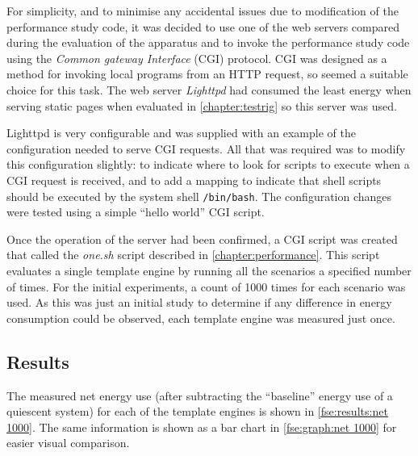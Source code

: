 For simplicity, and to minimise any accidental issues due to modification of the performance study code, it was decided to use one of the web servers compared during the evaluation of the apparatus and to invoke the performance study code using the \emph{Common gateway Interface} (CGI) protocol. CGI was designed as a method for invoking local programs from an HTTP request, so seemed a suitable choice for this task. The web server \emph{Lighttpd} had consumed the least energy when serving static pages when evaluated in \autoref{chapter:testrig} so this server was used.

Lighttpd is very configurable and was supplied with an example of the configuration needed to serve CGI requests. All that was required was to modify this configuration slightly: to indicate where to look for scripts to execute when a CGI request is received, and to add a mapping to indicate that shell scripts should be executed by the system shell \verb!/bin/bash!. The configuration changes were tested using a simple \enquote{hello world} CGI script.

Once the operation of the server had been confirmed, a CGI script was created that called the \emph{one.sh} script described in \autoref{chapter:performance}. This script evaluates a single \gls{template engine} by running all the scenarios a specified number of times. For the initial experiments, a count of 1000 times for each scenario was used. As this was just an initial study to determine if any difference in energy consumption could be observed, each \gls{template engine} was measured just once.

\subsection{Results}
\label{fse results}

The measured net energy use (after subtracting the \enquote{baseline} energy use of a quiescent system) for each of the \gls{template engine}s is shown in \autoref{fse:results:net 1000}. The same information is shown as a bar chart in \autoref{fse:graph:net 1000} for easier visual comparison.

